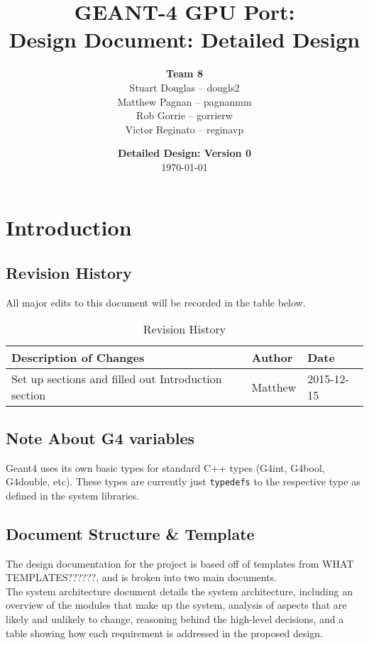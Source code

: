 \documentclass[12pt]{article}
\title{
\LARGE GEANT-4 GPU Port:
\\\vspace{10mm}
\large \textbf{Design Document: Detailed Design}
\vspace{40mm}
}
\author{
\textbf{Team 8}
\\Stuart Douglas -- dougls2
\\Matthew Pagnan -- pagnanmm
\\Rob Gorrie -- gorrierw
\\Victor Reginato -- reginavp
\vspace{10mm}
}
\date{\vfill \textbf{Detailed Design: Version 0}\\ \today}
\begin{document}

\maketitle
\newpage

\renewcommand{\contentsname}{Table of Contents}
\tableofcontents
\newpage
{}

\section{Introduction}
\subsection{Revision History}
All major edits to this document will be recorded in the table below.

\begin{table}[h]
\centering
\caption{Revision History}\label{Table_Revision}
\begin{tabular}{lll}

\toprule
\bf Description of Changes & \bf Author & \bf Date\\\midrule
Set up sections and filled out Introduction section & Matthew & 2015-12-15\\
\bottomrule
\end{tabular}
\end{table}

\subsection{Note About G4 variables}
Geant4 uses its own basic types for standard C++ types (G4int, G4bool, G4double, etc). These types are currently just \texttt{typedefs} to the respective type as defined in the system libraries.

\subsection{Document Structure \& Template}
The design documentation for the project is based off of templates from WHAT TEMPLATES??????, and is broken into two main documents.\\

The system architecture document details the system architecture, including an overview of the modules that make up the system, analysis of aspects that are likely and unlikely to change, reasoning behind the high-level decisions, and a table showing how each requirement is addressed in the proposed design.\\
\end{document}
